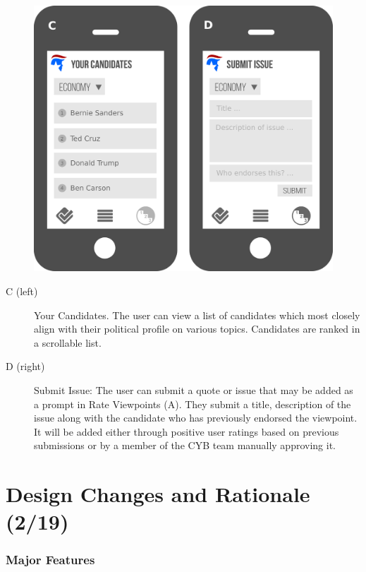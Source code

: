 \documentclass[11pt]{article}
\begin{document}
\begin{figure}[h]
    \includegraphics[width = \textwidth]{second.png}
\end{figure}

\begin{description}
    \item[C (left)] Your Candidates. The user can view a list of candidates which most closely align with their political profile on various topics. Candidates are ranked in a scrollable list.
    \item[D (right)] Submit Issue: The user can submit a quote or issue that may be added as a prompt in Rate Viewpoints (A). They submit a title, description of the issue along with the candidate who has previously endorsed the viewpoint. It will be added either through positive user ratings based on previous submissions or by a member of the CYB team manually approving it.
\end{description}

\newpage

\section{Design Changes and Rationale (2/19)}

\subsubsection{Major Features}
\end{document}
